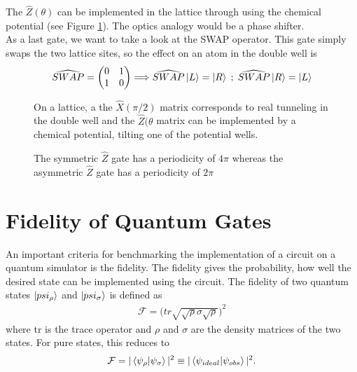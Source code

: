 The $\widehat{Z}(\theta)$ can be implemented in the lattice through using the chemical potential (see Figure \ref{fig:LRXandLRZ}). The optics analogy would be a phase shifter.\\
As a last gate, we want to take a look at the SWAP operator. This gate simply swaps the two lattice sites, so the effect on an atom in the double well is
\begin{align}
    \widehat{SWAP} = \begin{pmatrix}
        0 & 1\\
        1 & 0
    \end{pmatrix} \Longrightarrow \widehat{SWAP}\ket{L} = \ket{R} \;;\; \widehat{SWAP}\ket{R} = \ket{L}
\end{align}
\begin{figure}[t]
    \centering
    \caption[$\widehat{X}$ and $\widehat{Z}$ implementation on the lattice]{On a lattice, a the $\widehat{X}(\pi/2)$ matrix corresponds to real tunneling in the double well and the $\widehat{Z}(\theta$ matrix can be implemented by a chemical potential, tilting one of the potential wells.}
    \label{fig:LRXandLRZ}
\end{figure}

\begin{figure}
    \centering
    \caption[Periodicity of the symmetric and asymmetric $\widehat{Z}$ gate]{The symmetric $\widehat{Z}$ gate has a periodicity of $4\pi$ whereas the asymmetric $\widehat{Z}$ gate has a periodicity of $2\pi$}
    \label{fig:enter-label}
\end{figure}

\section{Fidelity of Quantum Gates}
An important criteria for benchmarking the implementation of a circuit on a quantum simulator is the fidelity. The fidelity gives the probability, how well the desired state can be implemented using the circuit. The fidelity of two quantum states $\ket{psi_\rho}$ and $\ket{psi_\sigma}$ is defined as
\begin{align}
    \mathcal{F}= \bigg(tr\sqrt{\sqrt\rho\sigma\sqrt{\rho}}\bigg)^2
\end{align}
where tr is the trace operator and $\rho$ and $\sigma$ are the density matrices of the two states. For pure states, this reduces to
\begin{align}
    \mathcal{F} = |\braket{\psi_{\rho}|\psi_{\sigma}}|^2 \equiv |\braket{\psi_{ideal}|\psi_{obs}}|^2.
\end{align}

